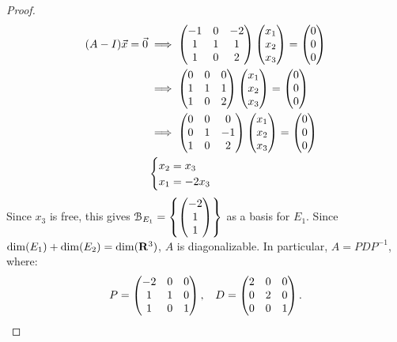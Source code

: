 \documentclass[10pt,twoside,openany]{memoir}
\begin{document}
{\begin{proof}
            \begin{equation*}
            \begin{split}
                (A-I)\vec{x} = \vec{0}
                & \implies \bmat -1 & 0 & -2 \\ 1 & 1 & 1 \\ 1 & 0 & 2 \emat \bmat x_1 \\ x_2 \\ x_3 \emat = \bmat 0 \\ 0 \\ 0 \emat \\
                & \implies \bmat 0 & 0 & 0 \\ 1 & 1 & 1 \\ 1 & 0 & 2 \emat \bmat x_1 \\ x_2 \\ x_3 \emat = \bmat 0 \\ 0 \\ 0 \emat \\ 
                & \implies \bmat 0 & 0 & 0 \\ 0 & 1 & -1 \\ 1 & 0 & 2 \emat \bmat x_1 \\ x_2 \\ x_3 \emat = \bmat 0 \\ 0 \\ 0 \emat \\ 
                & \begin{cases}
                    x_2 = x_3 \\
                    x_1 = -2x_3
                \end{cases}
            \end{split}
            \end{equation*}
        Since $x_3$ is free, this gives $\cB_{E_1} = \left\{ \bmat -2 \\ 1 \\ 1 \emat \right\}$ as a basis for $E_1$. Since $\dim(E_1) + \dim(E_2) = \dim(\bfR^3)$, $A$ is diagonalizable. In particular, $A = PDP^{-1}$, where:
            \begin{equation*}
            \begin{split}
                P = \bmat -2 & 0 & 0 \\ 1 & 1 & 0 \\ 1 & 0 & 1 \emat, \h9 D = \bmat 2 & 0 & 0 \\ 0 & 2 & 0 \\ 0 & 0 & 1 \emat.
            \end{split}
            \end{equation*}


\end{proof}}
\end{document}
